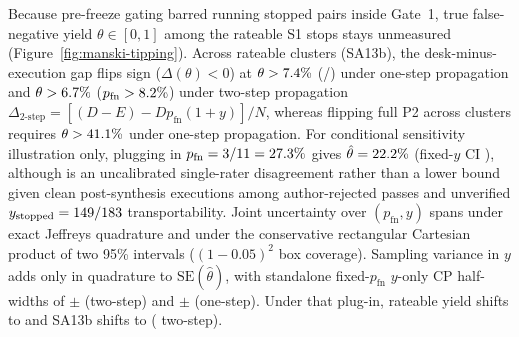 \documentclass[11pt]{article}
\begin{document}
Because pre-freeze gating barred running stopped pairs inside Gate~1, true false-negative yield $\theta \in [0, 1]$ among the \BenchRatedDeskStopRepsN{} rateable S1 stops stays unmeasured (Figure~\ref{fig:manski-tipping}).
Across \BenchRateableClustersN{} rateable clusters (SA13b), the desk-minus-execution gap flips sign ($\Delta(\theta) < 0$) at $\theta > 7.4\%{}$ (\BenchManskiTipNum{}/\BenchRatedDeskStopRepsN{}) under one-step propagation and $\theta > 6.7\%{}$ ($p_{\text{fn}} > 8.2\%{}$) under two-step propagation $\Delta_{\text{2-step}} = [(D - E) - D p_{\text{fn}}(1 + y)] / N$, whereas flipping full P2 across \BenchConfClustersN{} clusters requires $\theta > 41.1\%{}$ under one-step propagation.
For conditional sensitivity illustration only, plugging in $p_{\text{fn}} = 3/11 = 27.3\%{}$ gives $\hat{\theta} = 22.2\%{}$ (fixed-$y$ CI \BenchManskiPlugInThetaCI{}), although \BenchAuthConfAllStopRev{} is an uncalibrated single-rater disagreement rather than a lower bound given \BenchAuthRejExec{} clean post-synthesis executions among author-rejected passes and unverified $y_{\text{stopped}} = 149{}/183{}$ transportability.
Joint uncertainty over $(p_{\text{fn}}, y)$ spans \BenchManskiPlugJointJeffCI{} under exact Jeffreys quadrature and \BenchManskiPlugJointRectCI{} under the conservative rectangular Cartesian product of two 95\% intervals ($(1-0.05)^2$ box coverage).
Sampling variance in $y$ adds only \BenchManskiYDeltaSEDiffPP{} in quadrature to $\text{SE}(\hat{\theta})$, with standalone fixed-$p_{\text{fn}}$ $y$-only CP half-widths of $\pm$\BenchManskiYTwoStepHalfPP{} (two-step) and $\pm$\BenchManskiYOneStepHalfPP{} (one-step).
Under that plug-in, rateable yield shifts to \BenchManskiPlugInPOne{} and SA13b shifts to \BenchManskiPlugInSAThirteen{} (\BenchManskiPlugInTwoStepSAThirteen{} two-step).
\end{document}
